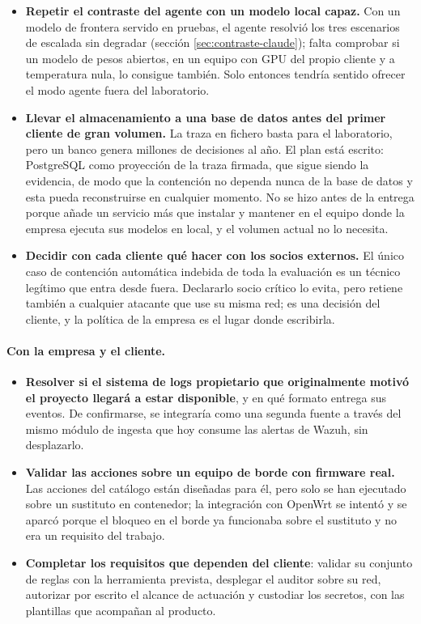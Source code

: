 \begin{itemize}
  \item \textbf{Repetir el contraste del agente con un modelo local capaz.} Con un modelo de frontera
        servido en pruebas, el agente resolvió los tres escenarios de escalada sin degradar (sección
        \ref{sec:contraste-claude}); falta comprobar si un modelo de pesos abiertos, en un equipo con
        GPU del propio cliente y a temperatura nula, lo consigue también. Solo entonces tendría
        sentido ofrecer el modo agente fuera del laboratorio.
  \item \textbf{Llevar el almacenamiento a una base de datos antes del primer cliente de gran
        volumen.} La traza en fichero basta para el laboratorio, pero un banco genera millones de
        decisiones al año. El plan está escrito: PostgreSQL como proyección de la traza firmada, que
        sigue siendo la evidencia, de modo que la contención no dependa nunca de la base de datos y
        esta pueda reconstruirse en cualquier momento. No se hizo antes de la entrega porque añade un
        servicio más que instalar y mantener en el equipo donde la empresa ejecuta sus modelos en
        local, y el volumen actual no lo necesita.
  \item \textbf{Decidir con cada cliente qué hacer con los socios externos.} El único caso de
        contención automática indebida de toda la evaluación es un técnico legítimo que entra desde
        fuera. Declararlo socio crítico lo evita, pero retiene también a cualquier atacante que use su
        misma red; es una decisión del cliente, y la política de la empresa es el lugar donde
        escribirla.
\end{itemize}

\paragraph{Con la empresa y el cliente.}

\begin{itemize}
  \item \textbf{Resolver si el sistema de logs propietario que originalmente motivó el proyecto
        llegará a estar disponible}, y en qué formato entrega sus eventos. De confirmarse, se
        integraría como una segunda fuente a través del mismo módulo de ingesta que hoy consume las
        alertas de Wazuh, sin desplazarlo.
  \item \textbf{Validar las acciones sobre un equipo de borde con firmware real.} Las acciones del
        catálogo están diseñadas para él, pero solo se han ejecutado sobre un sustituto en
        contenedor; la integración con OpenWrt se intentó y se aparcó porque el bloqueo en el borde ya
        funcionaba sobre el sustituto y no era un requisito del trabajo.
  \item \textbf{Completar los requisitos que dependen del cliente}: validar su conjunto de reglas con
        la herramienta prevista, desplegar el auditor sobre su red, autorizar por escrito el alcance
        de actuación y custodiar los secretos, con las plantillas que acompañan al producto.
\end{itemize}

